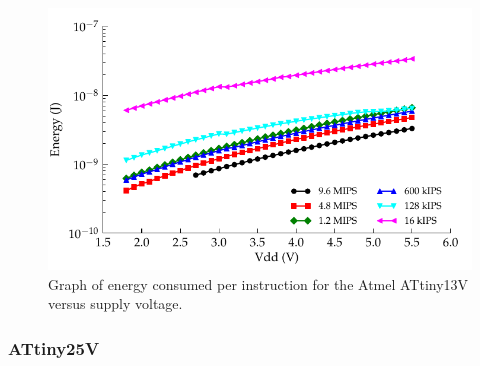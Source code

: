 \begin{figure}
  \centering
  \includegraphics{content/appendices/microprocessorPowerMeasurements/graphics/Graph_ATtiny13V_Clock_JPI}
  \protect\caption{
  \label{fig:ATtiny13VClkJPI}Graph of energy consumed per instruction for the
  Atmel ATtiny13V versus supply voltage.
  }
\end{figure}

\subsubsection*{ATtiny25V}


